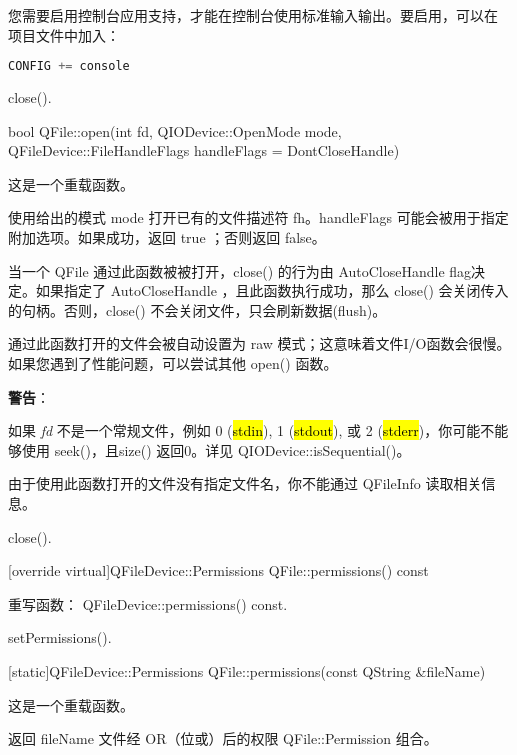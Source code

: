 您需要启用控制台应用支持，才能在控制台使用标准输入输出。要启用，可以在
项目文件中加入：

\begin{lstlisting}[language=C++]
CONFIG += console
\end{lstlisting}

\begin{notice}[另请参阅]
close().
\end{notice}

bool QFile::open(int fd, QIODevice::OpenMode mode, QFileDevice::FileHandleFlags handleFlags = DontCloseHandle)

这是一个重载函数。

使用给出的模式 mode 打开已有的文件描述符 fh。handleFlags 可能会被用于指定附加选项。如果成功，返回 true ；否则返回 false。

当一个 QFile 通过此函数被被打开，close() 的行为由 AutoCloseHandle flag决定。如果指定了 AutoCloseHandle ，且此函数执行成功，那么 close() 会关闭传入的句柄。否则，close() 不会关闭文件，只会刷新数据(flush)。

通过此函数打开的文件会被自动设置为 raw 模式；这意味着文件I/O函数会很慢。如果您遇到了性能问题，可以尝试其他 open() 函数。

\textbf{警告}：

\begin{compactitem}
\item 如果 \emph{fd} 不是一个常规文件，例如 0 (\hl{stdin}), 1 (\hl{stdout}), 或 2 (\hl{stderr})，你可能不能够使用 seek()，且size() 返回0。详见 QIODevice::isSequential()。
\item 由于使用此函数打开的文件没有指定文件名，你不能通过 QFileInfo 读取相关信息。

\end{compactitem}


\begin{notice}[另请参阅]
 close().
\end{notice}

[override virtual]QFileDevice::Permissions QFile::permissions() const

重写函数： QFileDevice::permissions() const.

\begin{notice}[另请参阅]
setPermissions().
\end{notice}

[static]QFileDevice::Permissions QFile::permissions(const QString \&fileName)

这是一个重载函数。

返回 fileName 文件经 OR（位或）后的权限 QFile::Permission 组合。

